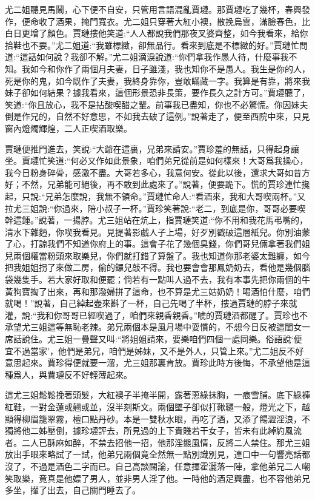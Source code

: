 \begin{parag}
    尤二姐聽見馬鬧，心下便不自安，只管用言語混亂賈璉。那賈璉吃了幾杯，春興發作，便命收了酒果，掩門寬衣。尤二姐只穿著大紅小襖，散挽烏雲，滿臉春色，比白日更增了顏色。賈璉摟他笑道:“人人都說我們那夜叉婆齊整，如今我看來，給你拾鞋也不要。”尤二姐道:“我雖標緻，卻無品行。看來到底是不標緻的好。”賈璉忙問道:“這話如何說？我卻不解。”尤二姐滴淚說道:“你們拿我作愚人待，什麼事我不知。我如今和你作了兩個月夫妻，日子雖淺，我也知你不是愚人。我生是你的人，死是你的鬼，如今既作了夫妻，我終身靠你，豈敢瞞藏一字。我算是有靠，將來我妹子卻如何結果？據我看來，這個形景恐非長策，要作長久之計方可。”賈璉聽了，笑道:“你且放心，我不是拈酸喫醋之輩。前事我已盡知，你也不必驚慌。你因妹夫倒是作兄的，自然不好意思，不如我去破了這例。”說著走了，便至西院中來，只見窗內燈燭輝煌，二人正喫酒取樂。
\end{parag}


\begin{parag}
    賈璉便推門進去，笑說:“大爺在這裏，兄弟來請安。”賈珍羞的無話，只得起身讓坐。賈璉忙笑道:“何必又作如此景象，咱們弟兄從前是如何樣來！大哥爲我操心，我今日粉身碎骨，感激不盡。大哥若多心，我意何安。從此以後，還求大哥如昔方好；不然，兄弟能可絕後，再不敢到此處來了。”說著，便要跪下。慌的賈珍連忙攙起，只說:“兄弟怎麼說，我無不領命。”賈璉忙命人:“看酒來，我和大哥喫兩杯。”又拉尤三姐說:“你過來，陪小叔子一杯。”賈珍笑著說:“老二，到底是你，哥哥必要喫幹這鍾。”說著，一揚脖。尤三姐站在炕上，指賈璉笑道:“你不用和我花馬弔嘴的，清水下雜麪，你喫我看見。見提著影戲人子上場，好歹別戳破這層紙兒。你別油蒙了心，打諒我們不知道你府上的事。這會子花了幾個臭錢，你們哥兒倆拿著我們姐兒兩個權當粉頭來取樂兒，你們就打錯了算盤了。我也知道你那老婆太難纏，如今把我姐姐拐了來做二房，偷的鑼兒敲不得。我也要會會那鳳奶奶去，看他是幾個腦袋幾隻手。若大家好取和便罷；倘若有一點叫人過不去，我有本事先把你兩個的牛黃狗寶掏了出來，再和那潑婦拼了這命，也不算是尤三姑奶奶！喝酒怕什麼，咱們就喝！”說著，自己綽起壺來斟了一杯，自己先喝了半杯，摟過賈璉的脖子來就灌，說:“我和你哥哥已經喫過了，咱們來親香親香。”唬的賈璉酒都醒了。賈珍也不承望尤三姐這等無恥老辣。弟兄兩個本是風月場中耍慣的，不想今日反被這閨女一席話說住。尤三姐一疊聲又叫:“將姐姐請來，要樂咱們四個一處同樂。俗語說‘便宜不過當家’，他們是弟兄，咱們是姊妹，又不是外人，只管上來。”尤二姐反不好意思起來。賈珍得便就要一溜，尤三姐那裏肯放。賈珍此時方後悔，不承望他是這種爲人，與賈璉反不好輕薄起來。
\end{parag}


\begin{parag}
    這尤三姐鬆鬆挽著頭髮，大紅襖子半掩半開，露著蔥綠抹胸，一痕雪脯。底下綠褲紅鞋，一對金蓮或翹或並，沒半刻斯文。兩個墜子卻似打鞦韆一般，燈光之下，越顯得柳眉籠翠霧，檀口點丹砂。本是一雙秋水眼，再吃了酒，又添了餳澀淫浪，不獨將他二姊壓倒，據珍璉評去，所見過的上下貴賤若干女子，皆未有此綽約風流者。二人已酥麻如醉，不禁去招他一招，他那淫態風情，反將二人禁住。那尤三姐放出手眼來略試了一試，他弟兄兩個竟全然無一點別識別見，連口中一句響亮話都沒了，不過是酒色二字而已。自己高談闊論，任意揮霍灑落一陣，拿他弟兄二人嘲笑取樂，竟真是他嫖了男人，並非男人淫了他。一時他的酒足興盡，也不容他弟兄多坐，攆了出去，自己關門睡去了。
\end{parag}


